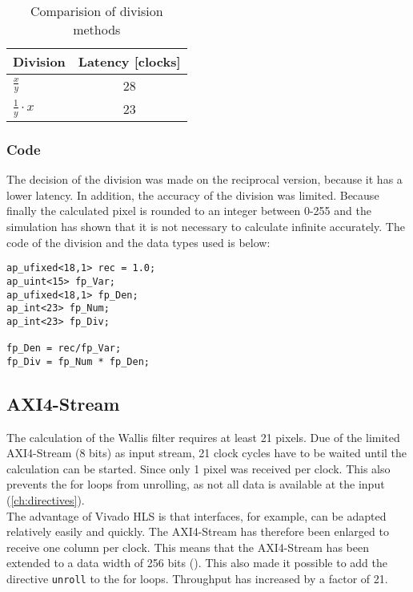 \begin{table}[tb!]
    \centering
    \begin{tabular}{l c}
        \toprule
        Division & Latency [clocks]  \\
        \midrule
        $\frac{x}{y}$ & 28 
        \\
        $\frac{1}{y} \cdot x$ & 23 
        \\
        \bottomrule
    \end{tabular}
    \caption{Comparision of division methods}
    \label{tab:c_div}
\end{table}

\subsubsection*{Code}
The decision of the division was made on the reciprocal version, because it has a lower latency. In addition, the accuracy of the division was limited. Because finally the calculated pixel is rounded to an integer between 0-255 and the simulation has shown that it is not necessary to calculate infinite accurately. The code of the division and the data types used is below:

\begin{minipage}{\textwidth}
\begin{lstlisting}[style=CStyle, caption=Calculation of the division for the Wallis filter, label=lst:division]
ap_ufixed<18,1> rec = 1.0;
ap_uint<15> fp_Var;
ap_ufixed<18,1> fp_Den;
ap_int<23> fp_Num;
ap_int<23> fp_Div;

fp_Den = rec/fp_Var;
fp_Div = fp_Num * fp_Den;
\end{lstlisting}
\end{minipage}


\subsection{AXI4-Stream}
The calculation of the Wallis filter requires at least 21 pixels. Due of the limited AXI4-Stream (8 bits) as input stream, 21 clock cycles have to be waited until the calculation can be started. Since only 1 pixel was received per clock. This also prevents the for loops from unrolling, as not all data is available at the input (\ref{ch:directives}). \\
The advantage of Vivado HLS is that interfaces, for example, can be adapted relatively easily and quickly. The AXI4-Stream has therefore been enlarged to receive one column per clock. This means that the AXI4-Stream has been extended to a data width of 256 bits (\cite{axi_stream}). This also made it possible to add the directive \texttt{unroll} to the for loops. Throughput has increased by a factor of 21.

